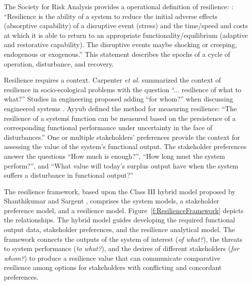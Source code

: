 The Society for Risk Analysis provides a operational definition of
resilience: \cite{SRA2016}: ``Resilience is the ability of a system to
reduce the initial adverse effects (absorptive capability) of a
disruptive event (stress) and the time/speed and costs at which it
is able to return to an appropriate functionality/equilibrium
(adaptive and restorative capability). The disruptive events maybe
shocking or creeping, endogenous or exogenous.'' This statement
describes the epochs of a cycle of operation, disturbance, and
recovery.


Resilience requires a context. Carpenter \emph{et al.}
\cite{Carpenter2001} summarized the context of resilience in
socio-ecological problems with the question ``... resilience of what
to what?''  Studies in engineering proposed adding ``for whom?'' when
discussing engineered systems \cite{Emanuel2017,Emanuel2018}. 
Ayyub \cite{Ayyub2014a} defined the method for measuring
resilience: ``The resilience of a system\'s function can be measured
based on the persistence of a corresponding functional performance
under uncertainty in the face of disturbances.'' One or multiple
stakeholders' preferences provide the context for assessing the value
of the system's functional output. The stakeholder preferences answer
the questions ``How much is enough?'', ``How long must the system
perform?'', and ``What value will today's surplus output have when the
system suffers a disturbance in functional output?''
\cite{Emanuel2017,Emanuel2018} 

The resilience framework, based upon the Class III hybrid model
proposed by Shanthikumar and Sargent \cite{Shanthikumar1983},
comprises the system models, a stakeholder preference model, and a resilience
model. Figure~\ref{f:ResilienceFramework} depicts the
relationships. The hybrid model guides
developing the required functional output data, stakeholder
preferences, and the resilience analytical model. The framework connects  the
outputs of the system of interest (\emph{of what?}), the threats to system
performance (\emph{to what?}),
and the desires of different stakeholders (\emph{for whom?}) to produce a resilience
value that can communicate comparative resilience among options for
 stakeholders with conflicting and concordant preferences.

